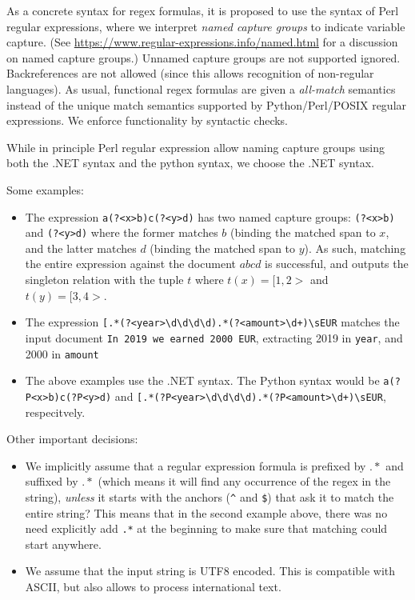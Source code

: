 \documentclass[a4paper,11pt,pdftex]{article}
\begin{document}
As a concrete syntax for regex formulas, it is proposed to use the syntax of
Perl regular expressions, where we interpret \emph{named capture groups} to
indicate variable capture. (See
\url{https://www.regular-expressions.info/named.html} for a discussion on named
capture groups.) Unnamed capture groups are not supported ignored. Backreferences are not allowed (since this allows recognition of non-regular languages). As usual, functional regex formulas are given a \emph{all-match} semantics instead of the unique match semantics supported by Python/Perl/POSIX regular expressions. We enforce functionality by syntactic checks.

While in principle Perl regular expression allow naming capture groups using both the .NET syntax and the python syntax, we choose the .NET syntax.


Some examples:
\begin{itemize}
\item The expression \verb!a(?<x>b)c(?<y>d)! has two named capture groups: \verb!(?<x>b)! and \verb!(?<y>d)! where the former matches $b$ (binding the matched span to $x$, and the latter matches $d$ (binding the matched span to $y$). As such, matching the entire expression against the document $abcd$ is successful, and outputs the singleton relation with the tuple $t$ where $t(x) = [1,2>$ and $t(y) = [3,4>$.
\item  The expression \verb![.*(?<year>\d\d\d\d).*(?<amount>\d+)\sEUR! matches the input document \verb!In 2019 we earned 2000 EUR!, extracting 2019 in \verb!year!, and 2000 in \verb!amount!
\item The above examples use the .NET syntax. The Python syntax would be  \verb!a(?P<x>b)c(?P<y>d)! and \verb![.*(?P<year>\d\d\d\d).*(?P<amount>\d+)\sEUR!, respecitvely.
\end{itemize}

Other important decisions:
\begin{itemize}
\item We implicitly assume that a regular expression formula is prefixed by $.*$ and suffixed by $.*$ (which means it will find any  occurrence of the regex in the string), \emph{unless} it starts with the anchors (\verb!^! and  \verb!$!) that ask it to match the entire string? This means that in the second example above, there was no need  explicitly add \verb!.*! at the beginning to make sure that matching could start anywhere.
\item We assume that the input string is UTF8 encoded. This is compatible with ASCII, but also allows to process international text.
\end{itemize}
\end{document}
